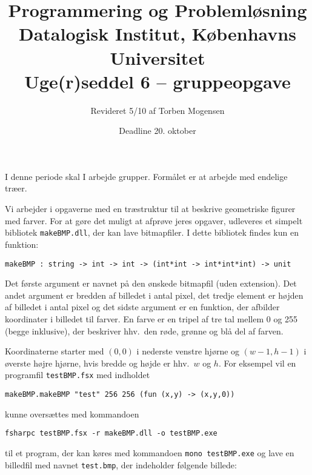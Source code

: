 \documentclass[a4paper]{article}
\begin{document}
\title{Programmering og Problemløsning\\
Datalogisk Institut, Københavns Universitet\\
Uge(r)seddel 6 -- gruppeopgave}

\author{Revideret 5/10 af Torben Mogensen}
\date{Deadline 20. oktober}

\maketitle

\noindent
I denne periode skal I arbejde grupper.  Formålet er at arbejde
med endelige træer.

Vi arbejder i opgaverne med en træstruktur til at beskrive geometriske
figurer med farver.  For at gøre det muligt at afprøve jeres opgaver,
udleveres et simpelt bibliotek \texttt{makeBMP.dll}, der kan lave
bitmapfiler.  I dette bibliotek findes kun en funktion:

\begin{verbatim}
makeBMP : string -> int -> int -> (int*int -> int*int*int) -> unit
\end{verbatim}

\noindent
Det første argument er navnet på den ønskede bitmapfil (uden
extension).  Det andet argument er bredden af billedet i antal pixel,
det tredje element er højden af billedet i antal pixel og det sidste
argument er en funktion, der afbilder koordinater i billedet til
farver.  En farve er en tripel af tre tal mellem 0 og 255 (begge
inklusive), der beskriver hhv.\ den røde, grønne og blå del af farven.

Koordinaterne starter med $(0,0)$ i nederste venstre hjørne og
$(w-1,h-1)$ i øverste højre hjørne, hvis bredde og højde er hhv.\ $w$
og $h$.  For eksempel vil en programfil \texttt{testBMP.fsx} med
indholdet

\begin{verbatim}
makeBMP.makeBMP "test" 256 256 (fun (x,y) -> (x,y,0))
\end{verbatim}

\noindent
kunne oversættes med kommandoen

\begin{verbatim}
fsharpc testBMP.fsx -r makeBMP.dll -o testBMP.exe
\end{verbatim}

\noindent
til et program, der kan køres med kommandoen \texttt{mono
  testBMP.exe} og lave en billedfil med navnet \texttt{test.bmp},
der indeholder følgende billede:
\end{document}
